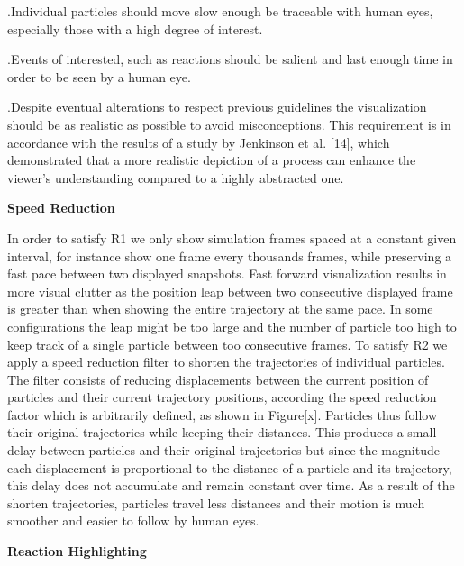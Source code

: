 .Individual particles should move slow enough be traceable with human eyes, especially those with a high degree of interest.

.Events of interested, such as reactions should be salient and last enough time in order to be seen by a human eye.

.Despite eventual alterations to respect previous guidelines the visualization should be as realistic as possible to avoid misconceptions. This requirement is in accordance with the results of a study by Jenkinson et al. [14], which demonstrated that a more realistic depiction of a process can enhance the viewer’s understanding compared to a highly abstracted one.

\textbf{Speed Reduction}

In order to satisfy R1 we only show simulation frames spaced at a constant given interval, for instance show one frame every thousands frames, while preserving a fast pace between two displayed snapshots.
Fast forward visualization results in more visual clutter as the position leap between two consecutive displayed frame is greater than when showing the entire trajectory at the same pace.
In some configurations the leap might be too large and the number of particle too high to keep track of a single particle between too consecutive frames.
To satisfy R2 we apply a speed reduction filter to shorten the trajectories of individual particles.
The filter consists of reducing displacements between the current position of particles and their current trajectory positions, according the speed reduction factor which is arbitrarily defined, as shown in Figure[x].
Particles thus follow their original trajectories while keeping their distances.
This produces a small delay between particles and their original trajectories but since the magnitude each displacement is proportional to the distance of a particle and its trajectory, this delay does not accumulate and remain constant over time.
As a result of the shorten trajectories, particles travel less distances and their motion is much smoother and easier to follow by human eyes.

\textbf{Reaction Highlighting}

